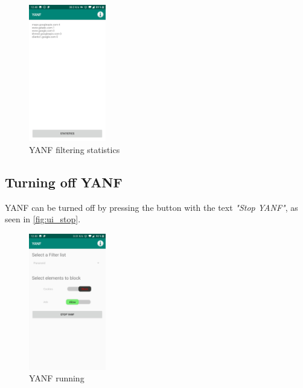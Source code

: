 \documentclass[main.tex]{subfiles}
\begin{document}
\begin{figure}[H]
    \centering
    \includegraphics[width=0.3\textwidth]{1_Appendix/UI/stats.jpg}
    \caption{YANF filtering statistics}
    \label{fig:ui_statistic}
\end{figure}

\subsection{Turning off YANF}
\label{sec:UG-turnOff}
YANF can be turned off by pressing the button with the text \textit{"Stop YANF"}, as seen in \autoref{fig:ui_stop}.

\begin{figure}[H]
    \centering
    \includegraphics[width=0.3\textwidth]{1_Appendix/UI/yanf_run.png}
    \caption{YANF running}
    \label{fig:ui_stop}
\end{figure}
\end{document}
